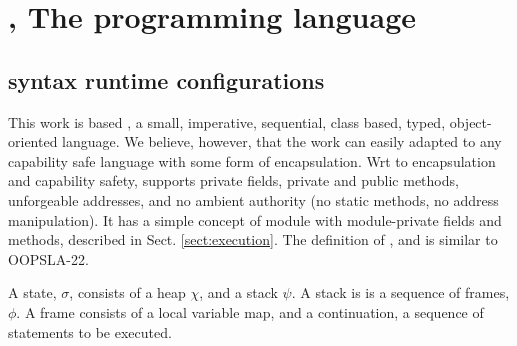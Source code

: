 \section{\LangOO, The programming language }  

\subsection{\LangOO syntax runtime configurations}
\label{sub:Loo} 
{This work} is based \LangOO, a {small}, imperative, sequential,  class based, typed, object-oriented language. 
 {We believe, however, that the work can easily adapted to any capability safe language with some form of encapsulation. 
Wrt to encapsulation and  capability safety},  \LangOO supports private fields, private and public methods, unforgeable addresses, and no ambient authority (no static methods, no address manipulation).
 It has a simple concept of module with module-private fields and methods, described in Sect. \ref{sect:execution}.
 The definition of , and is  similar to   OOPSLA-22.

A \LangOO state, $\sigma$,  consists of a  heap $\chi$, and a   stack $\psi$. A stack is is a sequence of frames, $\phi$.
A frame consists of a local variable map, and a continuation, \ie a sequence of statements to be executed.


 
